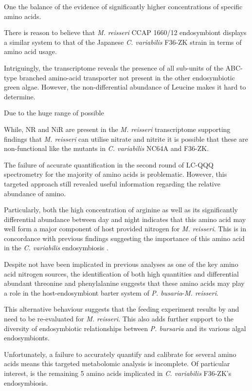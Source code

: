 One the balance of the evidence of significantly higher concentrations
of specific amino acids.

There is reason to believe that \textit{M. reisseri} CCAP 1660/12
endosymbiont displays a similar system to that of the Japanese
\textit{C. variabilis} F36-ZK strain in terms of amino acid usage. 

Intriguingly, the transcriptome reveals the presence of all sub-units
of the ABC-type branched amino-acid transporter not present in 
the other endosymbiotic green algae. However, the non-differential
abundance of Leucine makes it hard to determine.


Due to the huge range of possible 


While, NR and NiR are present in the \textit{M. reisseri} transcriptome
supporting findings that \textit{M. reisseri} can utilise nitrate and nitrite
it is possible that these are non-functional like the mutants in 
\textit{C. variabilis} NC64A and F36-ZK.


The failure of accurate quantification in the second round
of LC-QQQ spectrometry for the majority of amino acids 
is problematic.  However, this targeted approach still revealed
useful information regarding the relative abundance of amino.

Particularly, both the high concentration of arginine as well
as its significantly differential abundance between day and night
indicates that this amino acid may well form a major component of 
host provided nitrogen for \textit{M. reisseri}. This is in
concordance with previous findings suggesting 
the importance of this amino acid in the \textit{C. variabilis}
endosymbiosis \citep{Kato2006}.

Despite not have been implicated in previous analyses
as one of the key amino acid nitrogen sources, the identification
of both high quantities and differential abundant 
threonine and phenylalanine suggests that these
amino acids may play a role in the host-endosymbiont
barter system of \textit{P. busaria}-\textit{M. reisseri}.




This alternative behaviour suggests that the feeding experiment
results by \citep{Kato2006} and \citep{Kato2009} need 
to be re-evaluated for \textit{M. reisseri}. This also
adds further support to the diversity of endosymbiotic
relationships between \textit{P. bursaria} and its
various algal endosymbionts. 


Unfortunately, a failure to accurately quantify and calibrate
for several amino acids means this targeted metabolomic analysis
is incomplete.  Of particular interest, is the remaining 5 amino acids
implicated in \textit{C. variabilis} F36-ZK's endosymbiosis.


